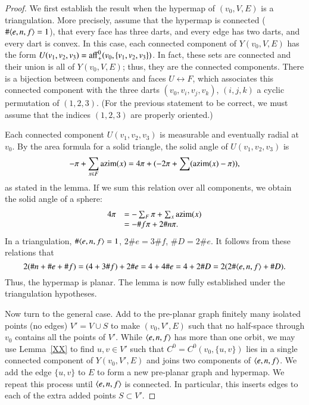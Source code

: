 \begin{proof}  We first establish the result when the hypermap
of $(v_0,V,E)$ is a triangulation.  More precisely, assume that the hypermap
is connected ($\#\langle e,n,f\rangle=1$), that every face has three darts,
and every edge has two darts, and every dart is convex.  
In this case, each connected component 
of $Y(v_0,V,E)$ has
the form $U(v_1,v_2,v_3)={\operatorname{aff}}_+^0(v_0,\{v_1,v_2,v_3\})$.  In fact,
these sets are connected and their union is all of $Y(v_0,V,E)$; thus,
they are the connected components.   There is a bijection
between components and faces $U \leftrightarrow F$, which associates this connected component
with the three darts $(v_0,v_i,v_j,v_k)$, $(i,j,k)$ a cyclic permutation
of $(1,2,3)$.  (For the previous statement to be correct, we must assume
that the indices $(1,2,3)$ are properly oriented.)

Each connected component $U(v_1,v_2,v_3)$ is measurable and eventually radial
at $v_0$.  By the area formula for a solid triangle, the solid angle of $U(v_1,v_2,v_3)$
is 
   $$-\pi + \sum_{x\in F} {\operatorname{azim}}(x) = 4\pi + (-2\pi + \sum ({\operatorname{azim}}(x) - \pi)),$$
as stated in the lemma.  If we sum this relation over all components, we obtain
the solid angle of a sphere:
   \begin{equation}\label{eqn:euler}
   \begin{array}{lll}
   4\pi &= -\sum_{F} \pi + \sum_{x} {\operatorname{azim}}(x)\\
        &= -\#f \pi + 2 \# n \pi.
   \end{array}
   \end{equation}
In a triangulation, $\#\langle e,n,f\rangle=1$, $2 \# e  = 3\#f$, $\# D = 2 \#e$.
It follows from these relations that
   $$
   2(\#n + \# e + \# f) = (4 + 3\#f) + 2\#e = 4 + 4\# e = 4 + 2 \# D = 2(2\#\langle e,n,f\rangle+\# D).
   $$
Thus, the hypermap is planar.  The lemma is now fully established under the
triangulation hypotheses.

Now turn to the general case.  Add to the pre-planar graph finitely many isolated
points (no edges) $V' = V\cup S$ to make $(v_0,V',E)$ such that no half-space
through $v_0$ contains all the points of $V'$.    While $\langle e,n,f\rangle$ has
more than one orbit, we may use Lemma~\ref{XX} to find $u,v\in V'$ such
that $C^0=C^0(v_0,\{u,v\})$ lies in a single connected component of $Y(v_0,V',E)$ and
joins two components of $\langle e,n,f\rangle$.  We add the edge $\{u,v\}$ to $E$ to form
a new pre-planar graph and hypermap.
We repeat this process until $\langle e,n,f\rangle$ is connected.  In particular, this
inserts edges to each of the extra added points $S\subset V'$.


\end{proof}
